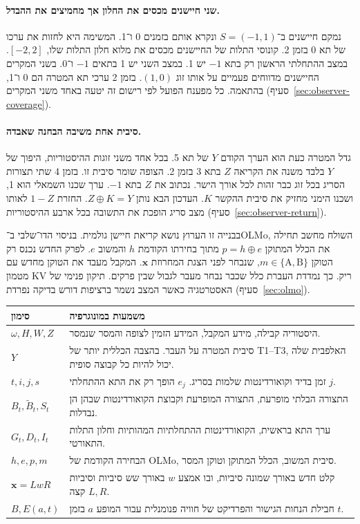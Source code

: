\documentclass[11pt,a4paper]{article}
\DeclareRobustCommand{\textenglish}[1]{\foreignlanguage{english}{#1}}
\theoremstyle{definition}
\begin{document}
\paragraph{שני חיישנים מכסים את החלון אך מחמיצים את ההבדל.}
נמקם חיישנים ב־$S=(-1,1)$ ונקרא אותם בזמנים 0 ו־1. המשימה היא לחזות את ערכו של תא 0 בזמן 2. קונוסי התלות של החיישנים מכסים את מלוא חלון התלות שלו, $[-2,2]$. במצב ההתחלתי הראשון רק בתא $-1$ יש 1. במצב השני יש 1 בתאים $-1$ ו־$0$. בשני המקרים החיישנים מדווחים פעמיים על אותו זוג $(1,0)$. בזמן 2 ערכי תא המטרה הם 0 ו־1, בהתאמה. כל מפענח הפועל לפי רישום זה יטעה באחד משני המקרים (סעיף~\ref{sec:observer-coverage}).

\paragraph{סיבית אחת משיבה הבחנה שאבדה.}
גדל המטרה כעת הוא הערך הקודם $Y$ של תא 5. בכל אחד משני זוגות ההיסטוריות, היפוך של $Y$ בלבד משנה את הקריאה $Z$ בתא 3 בזמן 2. הצופה שומר סיבית זו. בזמן 4 שתי תצורות הסריג בכל זוג כבר זהות לכל אורך הישר. נכתוב את $Z$ בתא $-1$. ערך שכנו השמאלי הוא 1, ושכנו הימני מחזיק את סיבית ההקשר $K$. העדכון הבא נותן $Z\oplus K=Y$. החזרת $1-Z$ לאותו מצב סריג הופכת את התשובה בכל ארבע ההיסטוריות (סעיף~\ref{sec:observer-return}).

בבנייה זו הערוץ נושא קריאת חיישן גולמית. בניסוי הדו־שלבי ב־\textenglish{OLMo}, השולח מחשב תחילה את הכלל המתוקן $p=h\oplus e$ מתוך בחירתו הקודמת $h$ והמשוב $e$. לפרק החדש נכנס רק הטוקן $m\in\{\mathrm{A},\mathrm{B}\}$, שנבחר לפני הצגת המחרוזת $\mathbf{x}$. המקבל מעבד את הטוקן מחדש עם מטמון \textenglish{KV} ריק. כך נמדדת העברת כלל שכבר נבחר מעבר לגבול שבין פרקים. תיקון פנימי של האסטרטגיה כאשר המצב נשמר ברציפות דורש בדיקה נפרדת (סעיף~\ref{sec:olmo}).

\begin{center}\small
\begin{tabularx}{\linewidth}{@{}lX@{}}\toprule
סימון & משמעות במונוגרפיה \\
\midrule
$\omega,H,W,Z$ & היסטוריה קבילה, מידע המקבל, המידע הזמין לצופה והמסר שנמסר.\\
$Y$ & סיבית המטרה על העבר. בהצבה הכללית יותר של \textenglish{T1--T3}, האלפבית שלה יכול להיות כל קבוצה סופית.\\
$t,i,j,s$ & זמן בדיד וקואורדינטות שלמות בסריג. $e_j$ הופך רק את התא ההתחלתי $j$.\\
$B_t,\widetilde B_t,S_t$ & התצורה הבלתי מופרעת, התצורה המופרעת וקבוצת הקואורדינטות שבהן הן נבדלות.\\
$G_t,D_t,I_t$ & ערך התא בראשית, הקואורדינטות ההתחלתיות המהותיות וחלון התלות התאורטי.\\
$h,e,p,m$ & הבחירה הקודמת של \textenglish{OLMo}, סיבית המשוב, הכלל המתוקן וטוקן המסר.\\
$\mathbf{x}=LwR$ & קלט חדש באורך שמונה סיביות, ובו אמצע $w$ באורך שש סיביות וסיביות קצה $L,R$.\\
$B,E(a,t)$ & חבילת הנחות הגישור והפרדיקט של חוויה פנומנלית עבור המופע $a$ בזמן $t$.\\
\bottomrule\end{tabularx}
\end{center}
\end{document}
